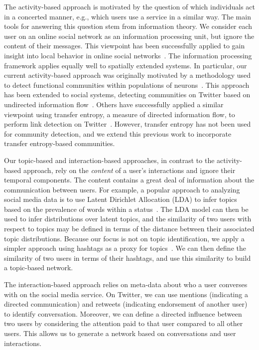 The activity-based approach is motivated by the question of which individuals act in a concerted manner, e.g., which users use a service in a similar way. The main tools for answering this question stem from information theory. We consider each user on an online social network as an information processing unit, but ignore the content of their messages. This viewpoint has been successfully applied to gain insight into local behavior in online social networks~\cite{darmon2013understanding}. The information processing framework applies equally well to spatially extended systems. In particular, our current activity-based approach was originally motivated by a methodology used to detect functional communities within populations of neurons~\cite{shalizi2007discovering}. This approach has been extended to social systems, detecting communities on Twitter based on undirected information flow~\cite{darmon2013detecting}. Others have successfully applied a similar viewpoint using transfer entropy, a measure of directed information flow, to perform link detection on Twitter~\cite{ver2012information}. However, transfer entropy has not been used for community detection, and we extend this previous work to incorporate transfer entropy-based communities.

Our topic-based and interaction-based approaches, in contrast to the activity-based approach, rely on the \emph{content} of a user's interactions and ignore their temporal components. The content contains a great deal of information about the communication between users. For example, a popular approach to analyzing social media data is to use Latent Dirichlet Allocation (LDA) to infer topics based on the prevalence of words within a status~\cite{zhao2011comparing,michelson2010discovering}. The LDA model can then be used to infer distributions over latent topics, and the similarity of two users with respect to topics may be defined in terms of the distance between their associated topic distributions. Because our focus is not on topic identification, we apply a simpler approach using hashtags as a proxy for topics~\cite{becker2011beyond,tsur2012s}. We can then define the similarity of two users in terms of their hashtags, and use this similarity to build a topic-based network.

The interaction-based approach relies on meta-data about who a user converses with on the social media service. On Twitter, we can use mentions (indicating a directed communication) and retweets (indicating endorsement of another user) to identify conversation. Moreover, we can define a directed influence between two users by considering the attention paid to that user compared to all other users. This allows us to generate a network based on conversations and user interactions.

